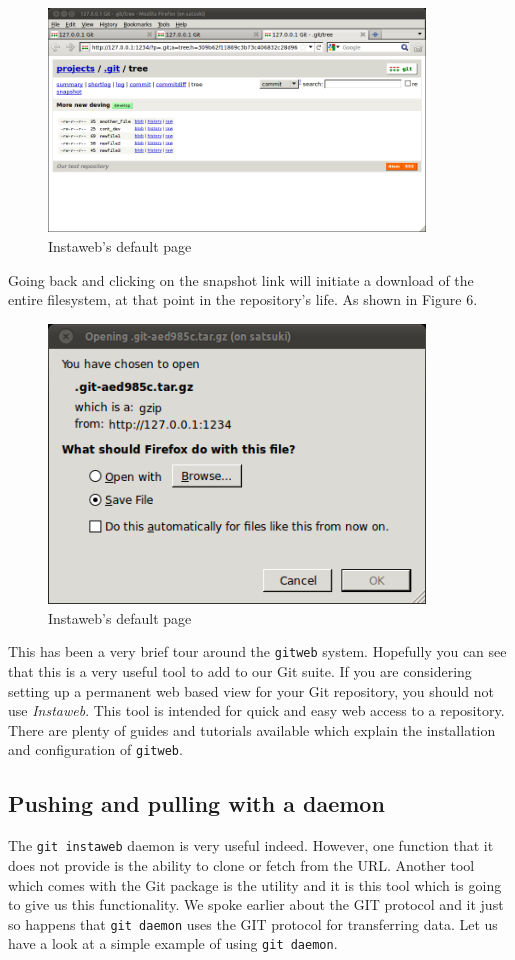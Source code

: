 \begin{figure}[hbt]
\centering
\includegraphics[width=10cm]{images/f-af7-d5.png}
\caption{Instaweb's default page}
\end{figure}

Going back and clicking on the snapshot link will initiate a download of the entire filesystem, at that point in the repository's life.
As shown in Figure 6.

\begin{figure}[hbt]
\centering
\includegraphics[width=10cm]{images/f-af7-d6.png}
\caption{Instaweb's default page}
\end{figure}

This has been a very brief tour around the \texttt{gitweb} system.
Hopefully you can see that this is a very useful tool to add to our Git suite.
If you are considering setting up a permanent web based view for your Git repository, you should not use \emph{Instaweb}.
This tool is intended for quick and easy web access to a repository.
There are plenty of guides and tutorials available which explain the installation and configuration of \texttt{gitweb}.

\subsection{Pushing and pulling with a daemon}
The \texttt{git instaweb} daemon is very useful indeed.
However, one function that it does not provide is the ability to clone or fetch from the URL.
Another tool which comes with the Git package is the  utility and it is this tool which is going to give us this functionality.
We spoke earlier about the GIT protocol and it just so happens that \texttt{git daemon} uses the GIT protocol for transferring data.
Let us have a look at a simple example of using \texttt{git daemon}.

